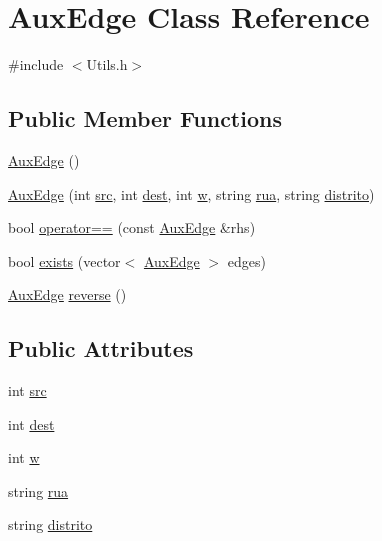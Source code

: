 \hypertarget{class_aux_edge}{}\section{Aux\+Edge Class Reference}
\label{class_aux_edge}


{\ttfamily \#include $<$Utils.\+h$>$}

\subsection*{Public Member Functions}
\begin{DoxyCompactItemize}
\item 
\hyperlink{class_aux_edge_aff00b230c80f8b62dca6ed5d1d4baaf9}{Aux\+Edge} ()
\item 
\hyperlink{class_aux_edge_ab937368463372c5f87c1805f46318b5a}{Aux\+Edge} (int \hyperlink{class_aux_edge_ae60cad09cc21dd040c40d81139dbc2e7}{src}, int \hyperlink{class_aux_edge_acee560d785382eeb7ed695c59903bbe9}{dest}, int \hyperlink{class_aux_edge_a688348db28aaaea42d86ea26f33177b2}{w}, string \hyperlink{class_aux_edge_a7a52a82fb74a6eddcdab0d4d45917767}{rua}, string \hyperlink{class_aux_edge_aa9a8ff092babb6f3e3df271b400cdf17}{distrito})
\item 
bool \hyperlink{class_aux_edge_ac5b9bcaa74464f7a5e79ec56d4c87b0d}{operator==} (const \hyperlink{class_aux_edge}{Aux\+Edge} \&rhs)
\item 
bool \hyperlink{class_aux_edge_ac05b44fbcf9e494b0d92df6359ac9932}{exists} (vector$<$ \hyperlink{class_aux_edge}{Aux\+Edge} $>$ edges)
\item 
\hyperlink{class_aux_edge}{Aux\+Edge} \hyperlink{class_aux_edge_a6561f80676278a04d73640c2166c438f}{reverse} ()
\end{DoxyCompactItemize}
\subsection*{Public Attributes}
\begin{DoxyCompactItemize}
\item 
int \hyperlink{class_aux_edge_ae60cad09cc21dd040c40d81139dbc2e7}{src}
\item 
int \hyperlink{class_aux_edge_acee560d785382eeb7ed695c59903bbe9}{dest}
\item 
int \hyperlink{class_aux_edge_a688348db28aaaea42d86ea26f33177b2}{w}
\item 
string \hyperlink{class_aux_edge_a7a52a82fb74a6eddcdab0d4d45917767}{rua}
\item 
string \hyperlink{class_aux_edge_aa9a8ff092babb6f3e3df271b400cdf17}{distrito}
\end{DoxyCompactItemize}


